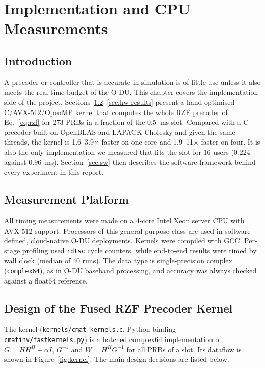 \chapter{Implementation and CPU Measurements}
\label{ch:impl}
\thispagestyle{plain}

\section{Introduction}

A precoder or controller that is accurate in simulation is of little use unless it also meets the real-time budget of the O-DU. This chapter covers the implementation side of the project. Sections~\ref{sec:hw-platform}--\ref{sec:hw-results} present a hand-optimised C/AVX-512/OpenMP kernel that computes the whole RZF precoder of Eq.~\eqref{eq:rzf} for 273 PRBs in a fraction of the 0.5~ms slot. Compared with a C precoder built on OpenBLAS and LAPACK Cholesky and given the same threads, the kernel is 1.6--3.9$\times$ faster on one core and 1.9--11$\times$ faster on four. It is also the only implementation we measured that fits the slot for 16 users (0.224 against 0.96~ms). Section~\ref{sec:sw} then describes the software framework behind every experiment in this report.

\section{Measurement Platform}
\label{sec:hw-platform}

All timing measurements were made on a 4-core Intel Xeon server CPU with AVX-512 support. Processors of this general-purpose class are used in software-defined, cloud-native O-DU deployments. Kernels were compiled with GCC. Per-stage profiling used \texttt{rdtsc} cycle counters, while end-to-end results were timed by wall clock (median of 40 runs). The data type is single-precision complex (\texttt{complex64}), as in O-DU baseband processing, and accuracy was always checked against a float64 reference.

\section{Design of the Fused RZF Precoder Kernel}
\label{sec:hw-kernel}

The kernel (\texttt{kernels/cmat\_kernels.c}, Python binding \texttt{cmatinv/fastkernels.py}) is a batched complex64 implementation of $G = HH^H + \alpha I$, $G^{-1}$ and $W = H^H G^{-1}$ for all PRBs of a slot. Its dataflow is shown in Figure~\ref{fig:kernel}. The main design decisions are listed below.

